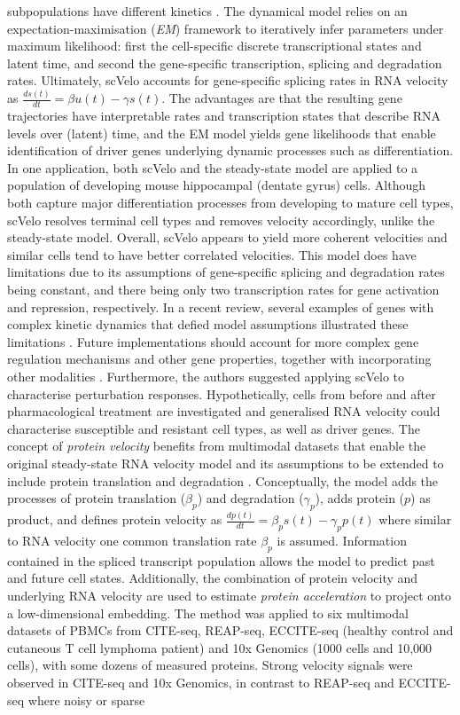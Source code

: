 \documentclass[times, twoside, watermark]{zHenriquesLab-StyleBioRxiv}
\begin{document}
subpopulations have different kinetics \cite{Bergen2020}. The dynamical model relies on an expectation-maximisation (\textit{EM}) framework to iteratively infer parameters under maximum likelihood: first the cell-specific discrete transcriptional states and latent time, and second the gene-specific transcription, splicing and degradation rates. Ultimately, scVelo accounts for gene-specific splicing rates in RNA velocity as $\frac{ds(t)}{dt} = \beta u(t)-\gamma s(t)$. The advantages are that the resulting gene trajectories have interpretable rates and transcription states that describe RNA levels over (latent) time, and the EM model yields gene likelihoods that enable identification of driver genes underlying dynamic processes such as differentiation. In one application, both scVelo and the steady-state model are applied to a population of developing mouse hippocampal (dentate gyrus) cells. Although both capture major differentiation processes from developing to mature cell types, scVelo resolves terminal cell types and removes velocity accordingly, unlike the steady-state model. Overall, scVelo appears to yield more coherent velocities and similar cells tend to have better correlated velocities. This model does have limitations due to its assumptions of gene-specific splicing and degradation rates being constant, and there being only two transcription rates for gene activation and repression, respectively. In a recent review, several examples of genes with complex kinetic dynamics that defied model assumptions illustrated these limitations \cite{Bergen2021}. Future implementations should account for more complex gene regulation mechanisms and other gene properties, together with incorporating other modalities \cite{Bergen2020, Bergen2021}. Furthermore, the authors suggested applying scVelo to characterise perturbation responses. Hypothetically, cells from before and after pharmacological treatment are investigated and generalised RNA velocity could characterise susceptible and resistant cell types, as well as driver genes. \newline The concept of \textit{protein velocity} benefits from multimodal datasets that enable the original steady-state RNA velocity model and its assumptions to be extended to include protein translation and degradation \cite{Gorin2020}. Conceptually, the model adds the processes of protein translation ($\beta _p$) and degradation ($\gamma _p$), adds protein ($p$) as product, and defines protein velocity as $\frac{dp(t)}{dt} = \beta _p s(t) - \gamma _p p(t)$ where similar to RNA velocity one common translation rate $\beta _p$ is assumed. Information contained in the spliced transcript population allows the model to predict past and future cell states. Additionally, the combination of protein velocity and underlying RNA velocity are used to estimate \textit{protein acceleration} to project onto a low-dimensional embedding. The method was applied to six multimodal datasets of PBMCs from CITE-seq, REAP-seq, ECCITE-seq (healthy control and cutaneous T cell lymphoma patient) and 10x Genomics (1000 cells and 10,000 cells), with some dozens of measured proteins. Strong velocity signals were observed in CITE-seq and 10x Genomics, in contrast to REAP-seq and ECCITE-seq where noisy or sparse 
\end{document}
